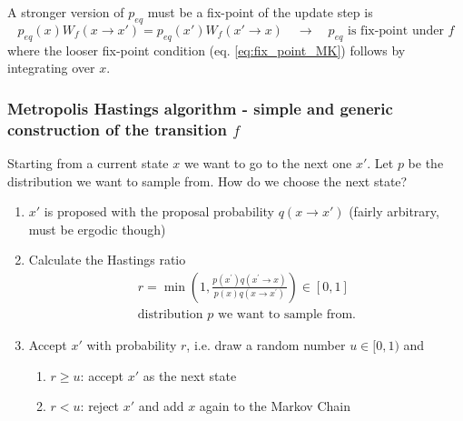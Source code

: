 
A stronger version of $p_{eq}$ must be a fix-point of the update step is
\begin{equation}
    p_{eq}(x) W_f(x\rightarrow x') = p_{eq}(x') W_f(x'\rightarrow x) \quad \rightarrow \quad p_{eq} \text{ is fix-point under } f
\end{equation}
where the looser fix-point condition (eq. \ref{eq:fix_point_MK}) follows
by integrating over $x$.


\subsubsection{Metropolis Hastings algorithm - simple and generic construction of the transition $f$}
Starting from a current state $x$ we want to go to the next one $x'$. Let $p$ be the distribution we want to sample from. How do we choose the next state?
\begin{enumerate}
    \item $x'$ is proposed with the proposal probability $q(x\rightarrow x')$ (fairly arbitrary, must be ergodic though)
    \item Calculate the Hastings ratio
    \begin{equation}
        \begin{gathered}
            r=\min \left(1, \frac{p\left(x^{\prime}\right) q\left(x^{\prime} \rightarrow x\right)}{p(x) q\left(x \rightarrow x^{\prime}\right)}\right) \in[0,1] \\
            \text{distribution } p \text{ we want to sample from.}
        \end{gathered}
    \end{equation}
    \item Accept $x'$ with probability $r$, i.e. draw a random number $u \in [0,1)$ and
    \begin{enumerate}
        \item $r\geq u$: accept $x'$ as the next state
        \item $r<u$: reject $x'$ and add $x$ again to the Markov Chain
    \end{enumerate}
\end{enumerate}

